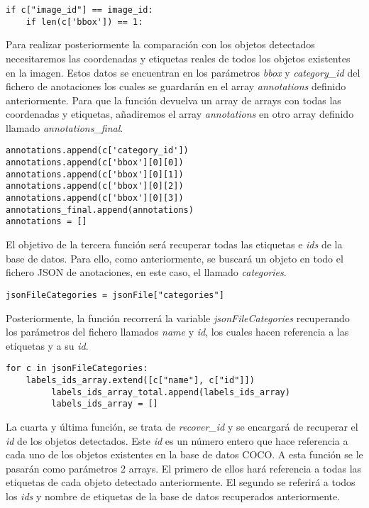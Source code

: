 \documentclass[a4paper, 12pt, spanish, chapterprefix, numbers=noenddot]{book}
\begin{document}
\begin{lstlisting}[frame=single]
if c["image_id"] == image_id:
	if len(c['bbox']) == 1:
\end{lstlisting}

Para realizar posteriormente la comparación con los objetos detectados necesitaremos las coordenadas y etiquetas reales de todos los objetos existentes en la imagen. Estos datos se encuentran en los parámetros \textit{bbox} y \textit{category\_id} del fichero de anotaciones los cuales se guardarán en el array \textit{annotations} definido anteriormente. Para que la función devuelva un array de arrays con todas las coordenadas y etiquetas, añadiremos el array \textit{annotations} en otro array definido llamado \textit{annotations\_final}.\\

\begin{lstlisting}[frame=single]
annotations.append(c['category_id'])
annotations.append(c['bbox'][0][0])
annotations.append(c['bbox'][0][1])
annotations.append(c['bbox'][0][2])
annotations.append(c['bbox'][0][3])
annotations_final.append(annotations)
annotations = []
\end{lstlisting}

El objetivo de la tercera función será recuperar todas las etiquetas e \textit{ids} de la base de datos. Para ello, como anteriormente, se buscará un objeto en todo el fichero JSON de anotaciones, en este caso, el llamado \textit{categories}.\\

\begin{lstlisting}[frame=single]
jsonFileCategories = jsonFile["categories"]
\end{lstlisting}

Posteriormente, la función recorrerá la variable \textit{jsonFileCategories} recuperando los parámetros del fichero llamados \textit{name} y \textit{id}, los cuales hacen referencia a las etiquetas y a su \textit{id}.\\

\begin{lstlisting}[frame=single]
for c in jsonFileCategories:
	labels_ids_array.extend([c["name"], c["id"]])
         labels_ids_array_total.append(labels_ids_array)
         labels_ids_array = []
\end{lstlisting}

La cuarta y última función, se trata de \textit{recover\_id} y se encargará de recuperar el \textit{id} de los objetos detectados. Este \textit{id} es un número entero que hace referencia a cada uno de los objetos existentes en la base de datos COCO. A esta función se le pasarán como parámetros 2 arrays. El primero de ellos hará referencia a todas las etiquetas de cada objeto detectado anteriormente. El segundo se referirá a todos los \textit{ids} y nombre de etiquetas de la base de datos recuperados anteriormente.\\
\end{document}

